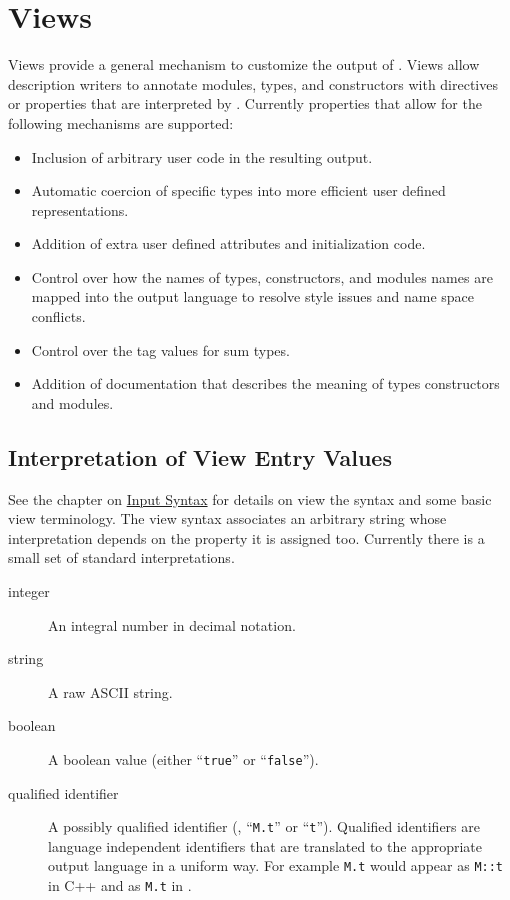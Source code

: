 %
\chapter{Views}
\label{chap:views}

Views provide a general mechanism to customize the output of
\asdlgen{}.
Views allow description writers to annotate modules, types, and constructors
with directives or properties that are interpreted by \asdlgen{}.
Currently \asdlgen{} properties that allow for the following mechanisms are
supported:
\begin{itemize}
  \item
    Inclusion of arbitrary user code in the resulting output.
  \item
    Automatic coercion of specific types into more efficient user
    defined representations.
  \item
    Addition of extra user defined attributes and initialization code.
  \item
    Control over how the names of types, constructors, and modules names
    are mapped into the output language to resolve style issues and name space
    conflicts.
  \item
    Control over the tag values for sum types.
  \item
    Addition of documentation that describes the meaning of types
    constructors and modules.
\end{itemize}%

\section{Interpretation of View Entry Values}

See the chapter on \hyperref[chap:syntax]{Input Syntax} for details on
view the syntax and some basic view terminology.
The view syntax associates
an arbitrary string whose interpretation depends on the property it is
assigned too.
Currently there is a small set of standard interpretations.
%
\begin{description}
  \item[integer]
    An integral number in decimal notation.
  \item[string]
    A raw ASCII string.
  \item[boolean]
    A boolean value (either ``\lstinline!true!'' or ``\lstinline!false!'').
  \item[qualified identifier]
    A possibly qualified identifier (\eg{}, ``\lstinline!M.t!'' or ``\lstinline!t!'').
    Qualified identifiers are language independent
    identifiers that are translated to the appropriate output language in a
    uniform way.
    For example \lstinline!M.t! would appear as \lstinline!M::t! in C++ and as
    \lstinline!M.t! in \sml{}.
\end{description}%

